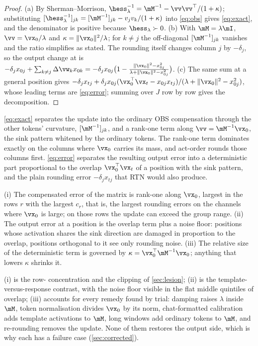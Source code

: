 \begin{proof}
(a) By Sherman--Morrison, $\hess_\lambda^{-1}=\mM^{-1}-\vv\vv^\top/(1+\kappa)$; substituting $[\hess_\lambda^{-1}]_{jk}=[\mM^{-1}]_{jk}-v_jv_k/(1+\kappa)$ into \cref{eq:obs} gives \cref{eq:exact}, and the denominator is positive because $\hess_\lambda\succ0$.
(b) With $\mM=\lambda\mI$, $\vv=\vx_0/\lambda$ and $\kappa=\|\vx_0\|^2/\lambda$; for $k\ne j$ the off-diagonal $[\mM^{-1}]_{jk}$ vanishes and the ratio simplifies as stated.
The rounding itself changes column $j$ by $-\delta_j$, so the output change at \bos{} is $-\delta_jx_{0j}+\sum_{k\ne j}\Delta\vw_kx_{0k}=-\delta_jx_{0j}\big(1-\tfrac{\|\vx_0\|^2-x_{0j}^2}{\lambda+\|\vx_0\|^2-x_{0j}^2}\big)$.
(c) The same sum at a general position gives $-\delta_jx_{tj}+\delta_jx_{0j}(\vx_0^\top\vx_t-x_{0j}x_{tj})/(\lambda+\|\vx_0\|^2-x_{0j}^2)$, whose leading terms are \cref{eq:error}; summing over $J$ row by row gives the decomposition.
\end{proof}
\cref{eq:exact} separates the update into the ordinary OBS compensation through the other tokens' curvature, $[\mM^{-1}]_{jk}$, and a rank-one term along $\vv=\mM^{-1}\vx_0$, the sink pattern whitened by the ordinary tokens.
The rank-one term dominates exactly on the columns where $\vx_0$ carries its mass, and act-order rounds those columns first.
\cref{eq:error} separates the resulting output error into a deterministic part proportional to the overlap $\vx_0^\top\vx_t$ of a position with the sink pattern, and the plain rounding error $-\delta_jx_{tj}$ that RTN would also produce.
\begin{corollary}
\label{cor:shape}
(i) The compensated error of the matrix is rank-one along $\vx_0$, largest in the rows $r$ with the largest $c_r$, that is, the largest rounding errors on the channels where $\vx_0$ is large; on those rows the update can exceed the group range.
(ii) The output error at a position is the overlap term plus a noise floor: positions whose activation shares the sink direction are damaged in proportion to the overlap, positions orthogonal to it see only rounding noise.
(iii) The relative size of the deterministic term is governed by $\kappa=\vx_0^\top\mM^{-1}\vx_0$; anything that lowers $\kappa$ shrinks it.
\end{corollary}
(i) is the row-\LsinkRow{} concentration and the clipping of \cref{sec:lesion}; (ii) is the template-versus-response contrast, with the noise floor visible in the flat middle quintiles of overlap; (iii) accounts for every remedy found by trial: damping raises $\lambda$ inside $\mM$, token normalisation divides $\vx_0$ by its norm, chat-formatted calibration adds template activations to $\mM$, long windows add ordinary tokens to $\mM$, and re-rounding removes the update.
None of them restores the output side, which is why each has a failure case (\cref{sec:corrected}).

